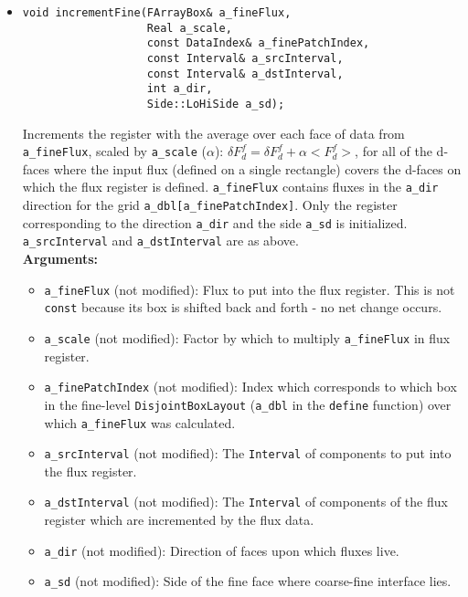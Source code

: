 \begin{itemize}
\item
\begin{verbatim}
void incrementFine(FArrayBox& a_fineFlux,
                   Real a_scale,
                   const DataIndex& a_finePatchIndex,
                   const Interval& a_srcInterval,
                   const Interval& a_dstInterval,
                   int a_dir,
                   Side::LoHiSide a_sd);
\end{verbatim}
Increments the register with the average over each face of data from 
\verb/a_fineFlux/, scaled by \verb/a_scale/ ($\alpha$):
$\delta F^f_d = \delta F^f_d + \alpha <F^f_d>$, for all of the d-faces
where the input flux (defined on a single rectangle) covers the
d-faces on which the flux register is defined.
\verb/a_fineFlux/ contains fluxes in the \verb/a_dir/
direction for the grid \verb/a_dbl[a_finePatchIndex]/. Only the register
corresponding to the direction \verb/a_dir/ and the side \verb/a_sd/ is 
initialized. \verb/a_srcInterval/ and \verb/a_dstInterval/ are as
above.
\\ {\bf Arguments:} 
  \begin{itemize}
  \item
  \verb/a_fineFlux/ (not modified):
  Flux to put into the flux register.
  This is not \verb/const/ because its box is shifted back and forth -
  no net change occurs.
  \item
  \verb/a_scale/ (not modified):
  Factor by which to multiply \verb/a_fineFlux/ in flux register.
  \item
  \verb/a_finePatchIndex/ (not modified):
  Index which corresponds to which box in the fine-level
  \verb/DisjointBoxLayout/ (\verb/a_dbl/ in the \verb/define/
  function) over which \verb/a_fineFlux/ was calculated.
  \item
  \verb/a_srcInterval/ (not modified):
  The \verb/Interval/ of components to put into the flux register.
  \item
  \verb/a_dstInterval/ (not modified):
  The \verb/Interval/ of components of the flux register which are
  incremented by the flux data.
  \item
  \verb/a_dir/ (not modified):
  Direction of faces upon which fluxes live.
  \item
  \verb/a_sd/ (not modified):
  Side of the fine face where coarse-fine interface lies.
  \end{itemize}


\end{itemize}
